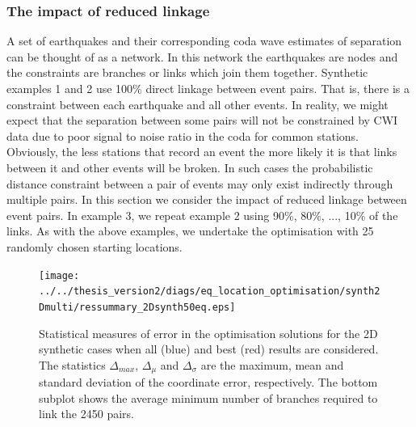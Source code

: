 \documentclass[extra]{gji}
\begin{document}
\subsubsection{The impact of reduced linkage}

A set of earthquakes and their corresponding coda wave estimates of separation can be thought of as
a network. In this network the earthquakes are nodes and the constraints are branches or links
which join them together. Synthetic examples 1 and 2 use 100\% direct linkage between event pairs. That is, there is a constraint
between each earthquake and all other events. In reality, we might expect that the separation between some
pairs will not be constrained by CWI data due to poor signal to noise ratio in the coda for common stations.
Obviously, the less stations that record an event the more likely it is that links
between it and other events will be broken.
In such cases the probabilistic distance constraint between a pair of
events may only exist indirectly through multiple pairs. In this section we
consider the impact of reduced linkage between event pairs. In example 3, we repeat example 2
using 90\%, 80\%, ..., 10\% of the links. As with the above examples, we undertake the
optimisation with 25 randomly chosen starting locations.

\begin{figure}
\noindent\texttt{[image: ../../thesis\_version2/diags/eq\_location\_optimisation/synth2Dmulti/ressummary\_2Dsynth50eq.eps]}
\caption{Statistical measures of error in the optimisation solutions for the 2D synthetic cases when all (blue)
and best (red) results are considered. The statistics $\Delta_{max}$, $\Delta_\mu$ and
$\Delta_\sigma$ are the maximum, mean and standard deviation of the coordinate error, respectively.
The bottom subplot shows the average minimum number of branches required to link the 2450 pairs.}
 \label{fig:optimisationresults-2Dsynth}
\end{figure}
\end{document}
